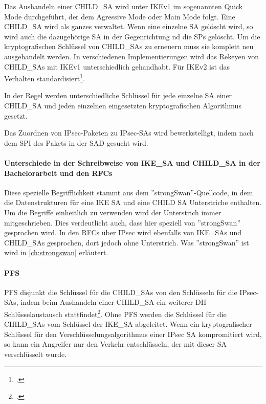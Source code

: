 Das Aushandeln einer CHILD\_SA wird unter IKEv1 im sogenannten Quick Mode durchgeführt, der dem Agressive Mode
oder Main Mode folgt.
Eine CHILD\_SA wird als ganzes verwaltet. Wenn eine einzelne \ac{SA} gelöscht wird, so wird
auch die dazugehörige \ac{SA} in der Gegenrichtung nd die \acp{SP} gelöscht.
Um die kryptografischen Schlüssel von CHILD\_SAs zu erneuern muss sie komplett neu ausgehandelt werden.
In verschiedenen Implementierungen wird das Rekeyen von CHILD\_SAs mit IKEv1 unterschiedlich gehandhabt.
Für IKEv2 ist das Verhalten standardisiert\footcite[][16]{charlie_kaufman_rfc_2014}.

In der Regel werden unterschiedliche Schlüssel für jede einzelne SA einer CHILD\_SA
und jeden einzelnen eingesetzten kryptografischen Algorithmus gesetzt.

Das Zuordnen von \ac{IPsec}-Paketen zu \ac{IPsec}-\acp{SA} wird bewerkstelligt,
indem nach dem \ac{SPI} des Pakets in der \ac{SAD} gesucht wird.

\paragraph{Unterschiede in der Schreibweise von IKE\_SA und CHILD\_SA in der Bachelorarbeit und den RFCs}
Diese spezielle Begrifflichkeit stammt aus dem ''strongSwan''-Quellcode, in dem
die Datenstrukturen für eine IKE SA und eine CHILD SA Unterstriche enthalten.
Um die Begriffe einheitlich zu verwenden wird der Unterstrich immer mitgeschrieben.
Dies verdeutlicht auch, dass hier speziell von ''strongSwan'' gesprochen wird.
In den \acp{RFC} über \ac{IPsec} wird ebenfalls von IKE\_SAs und CHILD\_SAs gesprochen,
dort jedoch ohne Unterstrich. Was ''strongSwan'' ist wird in \autoref{ch:strongswan} erläutert.

\paragraph{PFS}
\ac{PFS} disjunkt die Schlüssel für die CHILD\_SAs von den Schlüsseln
für die \ac{IPsec}-\acp{SA}, indem beim Aushandeln einer CHILD\_SA ein weiterer
\ac{DH}-Schlüsselaustausch stattfindet\footcite[13]{charlie_kaufman_rfc_2014}.
Ohne \ac{PFS} werden die Schlüssel für die CHILD\_SAs vom Schlüssel der IKE\_SA
abgeleitet. Wenn ein kryptografischer Schlüssel für den Verschlüsselungsalgorithmus
einer \ac{IPsec} \ac{SA} kompromitiert wird, so kann ein Angreifer nur den Verkehr entschlüsseln,
der mit dieser \ac{SA} verschlüsselt wurde.

